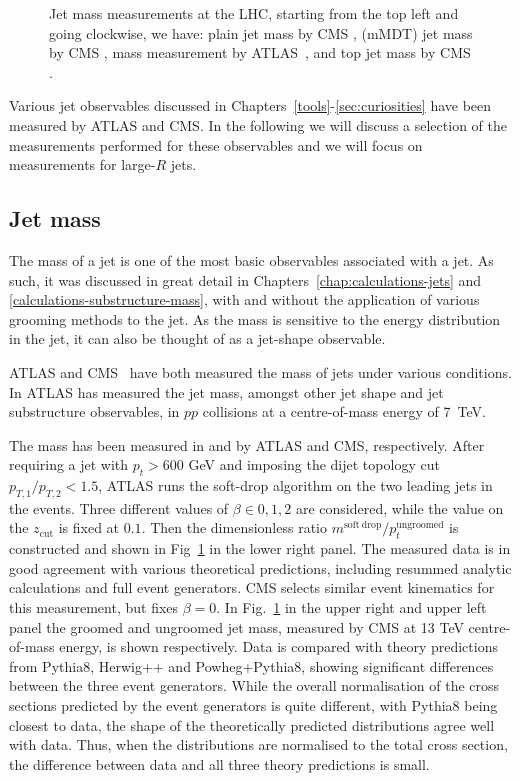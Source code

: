 \begin{figure}[t!]
  \caption{Jet mass measurements at the LHC, starting from the top
    left and going clockwise, we have: plain jet mass by CMS
    \cite{Sirunyan:2018xdh}, \SD (mMDT) jet mass by CMS \cite{Sirunyan:2018xdh}, \SD mass measurement by
    ATLAS~\cite{Aaboud:2017qwh}, and top jet mass by CMS \cite{Sirunyan:2017yar}.}\label{fig:jet_mass}
\end{figure}


Various jet observables discussed in Chapters~\ref{tools}-\ref{sec:curiosities} have been measured by ATLAS and CMS. In the following we will discuss a selection of the measurements performed for these observables and we will focus on measurements for large-$R$ jets.

\subsection{Jet mass}\label{sec:exp-jet-mass}

The mass of a jet is one of the most basic observables associated with a jet. As such, it was discussed in great detail in Chapters~\ref{chap:calculations-jets} and \ref{calculations-substructure-mass}, with and without the application of various grooming methods to the jet. As the mass is sensitive to the energy distribution in the jet, it can also be thought of as a jet-shape observable.

ATLAS \cite{ATLAS:2012am, Aaboud:2017qwh} and CMS~\cite{Sirunyan:2017yar, Sirunyan:2018xdh} have both measured the mass of jets under various conditions. In \cite{ATLAS:2012am} ATLAS has measured the jet mass, amongst other jet shape and jet substructure observables, in $pp$ collisions at a centre-of-mass energy of 7~TeV. 

The \SD mass has been measured in \cite{Aaboud:2017qwh} and \cite{
  Sirunyan:2018xdh} by ATLAS and CMS, respectively. After requiring a
jet with $p_t > 600$ GeV and imposing the dijet topology cut
$p_{T,1}/p_{T,2} < 1.5$, ATLAS runs the soft-drop algorithm on the two
leading jets in the events. Three different values of $\beta \in
{0,1,2}$ are considered, while the value on the $z_\mathrm{cut}$ is
fixed at $0.1$. Then the dimensionless ratio $m^{\mathrm{soft~drop}}/p_t^{\mathrm{ungroomed}}$ is constructed and
shown in Fig~\ref{fig:jet_mass} in the lower right panel. The measured data is in good agreement with various theoretical predictions, including resummed analytic calculations and full event generators.
%
CMS selects similar event kinematics for this measurement, but fixes $\beta=0$. In Fig.~\ref{fig:jet_mass} in the upper right and upper left panel the groomed and ungroomed jet mass, measured by CMS at 13 TeV centre-of-mass energy, is shown respectively. Data is compared with theory predictions from Pythia8, Herwig++ and Powheg+Pythia8, showing significant differences between the three event generators. While the overall normalisation of the cross sections predicted by the event generators is quite different, with Pythia8 being closest to data, the shape of the theoretically predicted distributions agree well with data. Thus, when the distributions are normalised to the total cross section, the difference between data and all three theory predictions is small.


